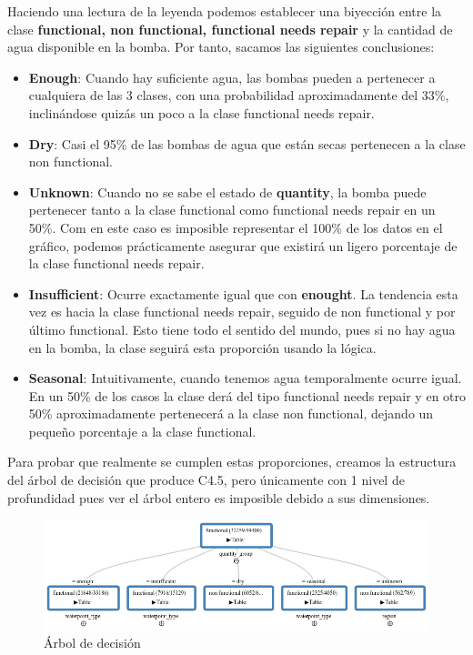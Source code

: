 	
	Haciendo una lectura de la leyenda podemos establecer una biyección entre la clase \textbf{ {functional, non functional, functional needs repair}} y la cantidad de agua disponible en la bomba.
	Por tanto, sacamos las siguientes conclusiones:
	
	\begin{itemize}
		\item \textbf{Enough}: Cuando hay suficiente agua, las bombas pueden a pertenecer a cualquiera de las 3 clases, con una probabilidad aproximadamente del 33\%, inclinándose quizás un poco a la clase functional needs repair.
		\item \textbf{Dry}: Casi el 95\% de las bombas de agua que están secas pertenecen a la clase non functional.
	
		\item \textbf{Unknown}: Cuando no se sabe el estado de \textbf{quantity}, la bomba puede pertenecer tanto a la clase functional como functional needs repair en un 50\%. Com en este caso es imposible representar el 100\% de los datos en el gráfico, podemos prácticamente asegurar que existirá un ligero porcentaje de la clase functional needs repair.
		\item \textbf{Insufficient}: Ocurre exactamente igual que con \textbf{enought}. La tendencia esta vez es hacia la clase functional needs repair, seguido de non functional y por último functional. Esto tiene todo el sentido del mundo, pues si no hay agua en la bomba, la clase seguirá esta proporción usando la lógica.
		
		\item \textbf{Seasonal}: Intuitivamente, cuando tenemos agua temporalmente ocurre igual. En un 50\% de los casos la clase derá del tipo functional needs repair y en otro 50\% aproximadamente pertenecerá a la clase non functional, dejando un pequeño porcentaje a la clase functional.
		
	\end{itemize}

	Para probar que realmente se cumplen estas proporciones, creamos la estructura del árbol de decisión que produce C4.5, pero únicamente con 1 nivel de profundidad pues ver el árbol entero es imposible debido a sus dimensiones. 
	
	\begin{figure}[H]
		\centering
		\includegraphics[width=1\textwidth]{img/tree.png}
		\caption{Árbol de decisión}
	\end{figure}

